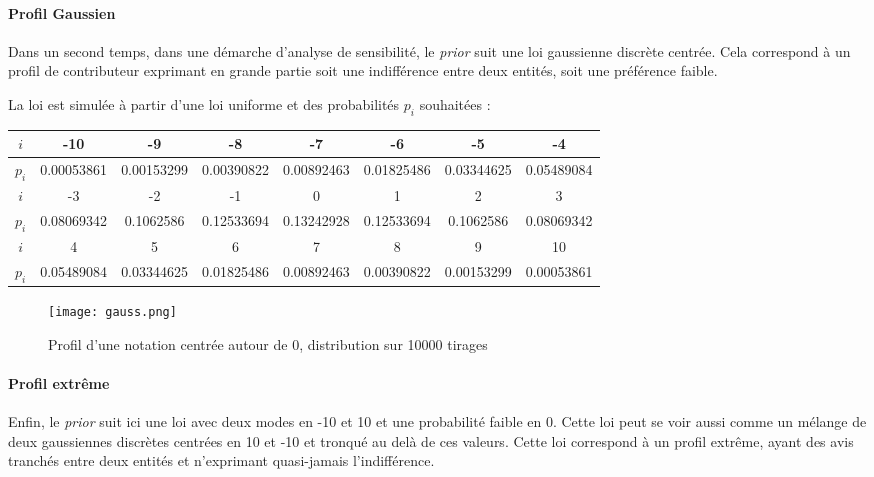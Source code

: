 \paragraph{Profil Gaussien}

Dans un second temps, dans une démarche d'analyse de sensibilité, le \textit{prior} suit une loi gaussienne discrète centrée. Cela correspond à un profil de contributeur exprimant en grande partie soit une indifférence entre deux entités, soit une préférence faible.

La loi est simulée à partir d'une loi uniforme et des probabilités $p_i$ souhaitées :
\begin{center}
\begin{tabular}{ |c|c|c|c|c|c|c|c| } 
\hline
$i$ & -10 & -9 & -8 & -7 & -6 & -5 & -4  \\
\hline
$p_i$ & 0.00053861 & 0.00153299 & 0.00390822 & 0.00892463 & 0.01825486 & 0.03344625 & 0.05489084  \\ 
\hline

$i$ & -3 & -2 & -1 & 0 & 1 & 2 & 3 \\
\hline
$p_i$ &  0.08069342 & 0.1062586 & 0.12533694 & 0.13242928 & 0.12533694 & 0.1062586 & 0.08069342  \\
\hline
$i$ & 4 & 5 & 6 & 7 & 8 & 9 & 10 \\
\hline
$p_i$ & 0.05489084 & 0.03344625 & 0.01825486 & 0.00892463 & 0.00390822 & 0.00153299 & 0.00053861\\
\hline
\end{tabular}
\end{center}



\begin{figure}[h!]
  \centering
  \texttt{[image: gauss.png]}
  \caption{Profil d'une notation centrée autour de 0, distribution sur 10000 tirages}
\end{figure}



\paragraph{Profil extrême}
Enfin, le \textit{prior} suit ici une loi avec deux modes en -10 et 10 et une probabilité faible en 0. Cette loi peut se voir aussi comme un mélange de deux gaussiennes discrètes centrées en 10 et -10 et tronqué au delà de ces valeurs. Cette loi correspond à un profil extrême, ayant des avis tranchés entre deux entités et n'exprimant quasi-jamais l'indifférence.

